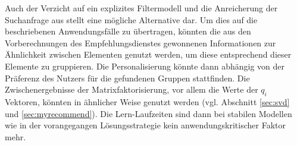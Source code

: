 Auch der Verzicht auf ein explizites Filtermodell und die Anreicherung der Suchanfrage aus \citep{Boughareb11} stellt eine mögliche Alternative dar. Um dies auf die beschriebenen Anwendungsfälle zu übertragen, könnten die aus den Vorberechnungen des Empfehlungsdienstes gewonnenen Informationen zur Ähnlichkeit zwischen Elementen genutzt werden, um diese entsprechend dieser Elemente zu gruppieren. Die Personalisierung könnte dann abhängig von der Präferenz des Nutzers für die gefundenen Gruppen stattfinden. Die Zwischenergebnisse der Matrixfaktorisierung, vor allem die Werte der $q_i$ Vektoren, könnten in ähnlicher Weise genutzt werden (vgl. Abschnitt \ref{sec:svd} und \ref{sec:myrecommend}). Die Lern-Laufzeiten sind dann bei stabilen Modellen wie in der vorangegangen Lösungsstrategie kein anwendungskritischer Faktor mehr.

%

